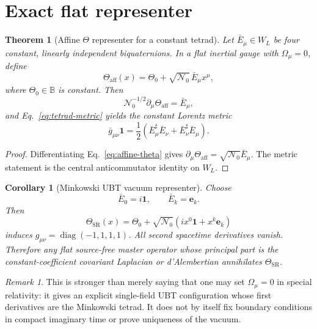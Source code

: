 \documentclass[12pt,a4paper]{article}
\newtheorem{theorem}[definition]{Theorem}
\newtheorem{corollary}[definition]{Corollary}
\theoremstyle{remark}\newtheorem{remark}[definition]{Remark}
\newcommand{\B}{\mathbb B}
\begin{document}
\section{Exact flat representer}
\begin{theorem}[Affine $\Theta$ representer for a constant tetrad]
\label{thm:flat-representer}
Let $\bar E_\mu\in W_L$ be four constant, linearly independent
biquaternions.  In a flat inertial gauge with $\Omega_\mu=0$, define
\begin{equation}
 \boxed{
 \Theta_{\mathrm{aff}}(x)
 =\Theta_0+\sqrt{\mathcal N_0}\,\bar E_\mu x^\mu,}
 \label{eq:affine-theta}
\end{equation}
where $\Theta_0\in\B$ is constant.  Then
\begin{equation}
 \mathcal N_0^{-1/2}\partial_\mu\Theta_{\mathrm{aff}}
 =\bar E_\mu,
\end{equation}
and Eq.~\eqref{eq:tetrad-metric} yields the constant Lorentz metric
\begin{equation}
 \bar g_{\mu\nu}\mathbf1
 =\frac12(\bar E_\mu^\sharp\bar E_\nu
         +\bar E_\nu^\sharp\bar E_\mu).
\end{equation}
\end{theorem}

\begin{proof}
Differentiating Eq.~\eqref{eq:affine-theta} gives
$\partial_\mu\Theta_{\mathrm{aff}}
=\sqrt{\mathcal N_0}\bar E_\mu$.  The metric statement is the central
anticommutator identity on $W_L$.
\end{proof}

\begin{corollary}[Minkowski UBT vacuum representer]
Choose
\begin{equation}
 \bar E_0=i\mathbf1,
 \qquad \bar E_k=\mathbf e_k.
\end{equation}
Then
\begin{equation}
 \boxed{
 \Theta_{\mathrm{SR}}(x)
 =\Theta_0+\sqrt{\mathcal N_0}
  \left(i x^0\mathbf1+x^k\mathbf e_k\right)}
 \label{eq:theta-sr}
\end{equation}
induces $g_{\mu\nu}=\operatorname{diag}(-1,1,1,1)$.  All second spacetime
derivatives vanish.  Therefore any flat source-free master operator whose
principal part is the constant-coefficient covariant Laplacian or d'Alembertian
annihilates $\Theta_{\mathrm{SR}}$.
\end{corollary}

\begin{remark}
This is stronger than merely saying that one may set $\Omega_\mu=0$ in special
relativity: it gives an explicit single-field UBT configuration whose first
derivatives are the Minkowski tetrad.  It does not by itself fix boundary
conditions in compact imaginary time or prove uniqueness of the vacuum.
\end{remark}
\end{document}
